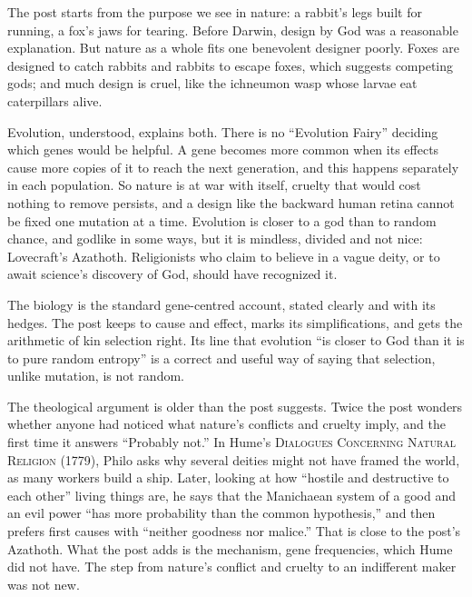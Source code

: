 \begin{afterword}
\summaryhead

The post starts from the purpose we see in nature: a rabbit's legs built for running, a fox's jaws for tearing. Before Darwin, design by God was a reasonable explanation. But nature as a whole fits one benevolent designer poorly. Foxes are designed to catch rabbits and rabbits to escape foxes, which suggests competing gods; and much design is cruel, like the ichneumon wasp whose larvae eat caterpillars alive.

Evolution, understood, explains both. There is no ``Evolution Fairy'' deciding which genes would be helpful. A gene becomes more common when its effects cause more copies of it to reach the next generation, and this happens separately in each population. So nature is at war with itself, cruelty that would cost nothing to remove persists, and a design like the backward human retina cannot be fixed one mutation at a time. Evolution is closer to a god than to random chance, and godlike in some ways, but it is mindless, divided and not nice: Lovecraft's Azathoth. Religionists who claim to believe in a vague deity, or to await science's discovery of God, should have recognized it.

\responsehead

The biology is the standard gene-centred account, stated clearly and with its hedges. The post keeps to cause and effect, marks its simplifications, and gets the arithmetic of kin selection right. Its line that evolution ``is closer to God than it is to pure random entropy'' is a correct and useful way of saying that selection, unlike mutation, is not random.

The theological argument is older than the post suggests. Twice the post wonders whether anyone had noticed what nature's conflicts and cruelty imply, and the first time it answers ``Probably not.'' In Hume's \textsc{Dialogues Concerning Natural Religion} (1779), Philo asks why several deities might not have framed the world, as many workers build a ship. Later, looking at how ``hostile and destructive to each other'' living things are, he says that the Manichaean system of a good and an evil power ``has more probability than the common hypothesis,'' and then prefers first causes with ``neither goodness nor malice.'' That is close to the post's Azathoth. What the post adds is the mechanism, gene frequencies, which Hume did not have. The step from nature's conflict and cruelty to an indifferent maker was not new.


\end{afterword}
